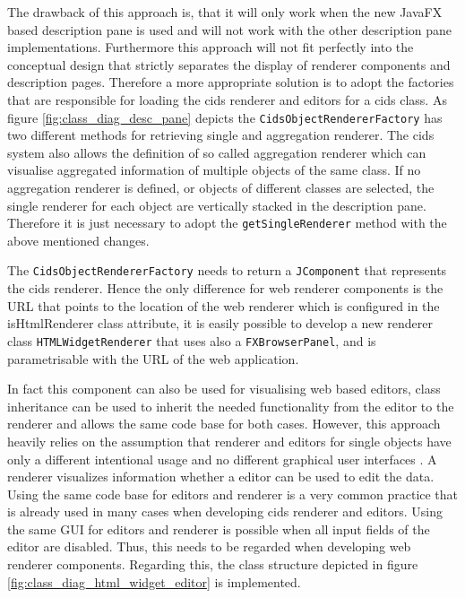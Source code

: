 The drawback of this approach is, that it will only work when the new JavaFX based description pane is used and will not work with the other description pane implementations.
Furthermore this approach will not fit perfectly into the conceptual design that strictly separates the display of renderer components and description pages.
Therefore a more appropriate solution is to adopt the factories that are responsible for loading the cids renderer and editors for a cids class.
As figure \ref{fig:class_diag_desc_pane} depicts the \texttt{CidsObjectRendererFactory} has two different methods for retrieving single and aggregation renderer.
The cids system also allows the definition of so called aggregation renderer which can visualise aggregated information of multiple objects of the same class.
If no aggregation renderer is defined, or objects of different classes are selected, the single renderer for each object are vertically stacked in the description pane.
Therefore it is just necessary to adopt the \texttt{getSingleRenderer} method with the above mentioned changes.

The \texttt{CidsObjectRendererFactory} needs to return a \texttt{JComponent} that represents the cids renderer.
Hence the only difference for web renderer components is the URL that  points to the location of the web renderer which is configured in the isHtmlRenderer class attribute, it is easily possible to develop a new renderer class \texttt{HTMLWidgetRenderer} that uses also a \texttt{FXBrowserPanel}, and is parametrisable  with the URL of the web application.

In fact this component can also be used for visualising web based editors, class inheritance can be used to inherit the needed functionality from the editor to the renderer and allows the same code base for both cases.
However, this approach heavily relies on the assumption that renderer and editors for single objects have only a different intentional usage and no different graphical user interfaces .
A renderer visualizes information whether a editor can be used to edit the data.
Using the same code base for editors and renderer is a very common practice that is  already used in many cases when developing cids renderer and editors.
Using the same GUI for editors and renderer is possible when all input fields of the editor are disabled.
Thus, this needs to be regarded when developing web renderer components.
Regarding this, the class structure depicted in figure  \ref{fig:class_diag_html_widget_editor} is implemented.

